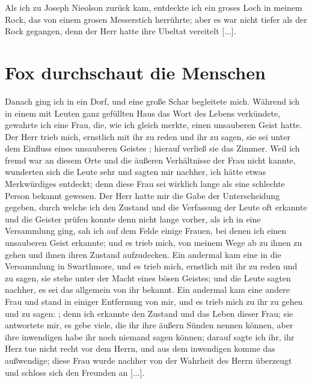 Als ich zu Joseph
Nieolson zurück kam, entdeckte ich ein groses Loch in meinem
Rock, das von einem grosen Messerstich herrührte; aber es war
nicht tiefer als der Rock gegangen, denn der Herr hatte ihre
Ubeltat vereitelt [...].

\section{Fox durchschaut die Menschen}

Danach ging ich in ein Dorf, und eine große Schar
begleitete mich. Während ich in einem mit Leuten ganz gefüllten
Haus das Wort des Lebens verkündete, gewahrte ich eine Frau,
die, wie ich gleich merkte, einen unsauberen Geist hatte. Der
Herr trieb mich, ernstlich mit ihr zu reden und ihr zu sagen, sie
sei unter dem Einfluss eines unsauberen 
Geistes
; 
hierauf verließ
sie das Zimmer. Weil ich fremd war an diesem Orte und die
äußeren Verhältnisse der Frau nicht kannte, wunderten sich die
Leute sehr und sagten mir nachher, ich hätte etwas Merkwürdiges
entdeckt; denn diese Frau sei wirklich lange als eine schlechte
Person bekannt gewesen. Der Herr hatte mir die Gabe der
Unterscheidung gegeben, durch welche ich den Zustand und die
Verfassung der Leute oft erkannte und die Geister prüfen konnte
denn nicht lange vorher, als ich in eine Versammlung ging, sah
ich auf dem Felde einige Frauen, bei denen ich einen unsauberen
Geist erkannte; und es trieb mich, von meinem Wege ab zu ihnen
zu gehen und ihnen ihren Zustand aufzudecken. Ein andermal
kam eine in die Versammlung in Swarthmore, 
und es trieb mich,
ernstlich mit ihr zu reden und zu sagen, sie stehe unter der Macht
eines bösen Geistes; und die Leute sagten 
nachher, es sei das
allgemein von ihr bekannt. Ein andermal kam eine andere Frau
und stand in einiger Entfernung von mir, und es trieb mich zu
ihr zu gehen und zu sagen: ; denn
ich erkannte den Zustand und das Leben dieser Frau; sie antwortete
mir, es gebe viele, die ihr ihre äußern Sünden nennen können,
aber ihre inwendigen habe ihr noch niemand sagen können; darauf
sagte ich ihr, ihr Herz tue nicht recht vor dem Herrn, und
aus dem inwendigen komme das außwendige; diese Frau wurde
nachher von der Wahrheit des Herrn überzeugt und schloss sich
den Freunden an [...].

\section{}

